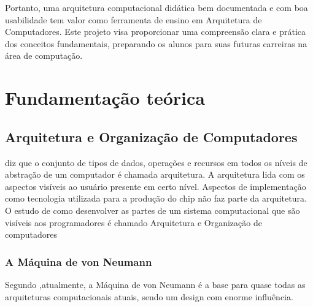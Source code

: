 \documentclass[
	12pt,				%
	openright,			%
	oneside,			%
	a4paper,			%
	english,			%
	french,				%
	spanish,			%
	brazil,				%
	]{abntex2}
\begin{document}
Portanto, uma arquitetura computacional didática bem documentada e com boa usabilidade tem valor como ferramenta de ensino em Arquitetura de Computadores. Este projeto visa proporcionar uma compreensão clara e prática dos conceitos fundamentais, preparando os alunos para suas futuras carreiras na área de computação.


\chapter{Fundamentação teórica}\label{cap_fund_teorica}

\section{Arquitetura e Organização de Computadores}

 diz que o conjunto de tipos de dados, operações e recursos em todos os níveis de abstração de um computador é chamada arquitetura. A arquitetura lida com os aspectos visíveis ao usuário presente em certo nível. Aspectos de implementação como tecnologia utilizada para a produção do chip não faz parte da arquitetura.
O estudo de como desenvolver as partes de um sistema computacional que são visíveis aos programadores é chamado Arquitetura e Organização de computadores

\subsection{A Máquina de von Neumann}\label{sec:maq_von_neumann}

Segundo ,atualmente, a Máquina de von Neumann é a base para quase todas as arquiteturas computacionais atuais, sendo um design com enorme influência.

\usetikzlibrary{positioning,calc,fit,arrows}
\end{document}
